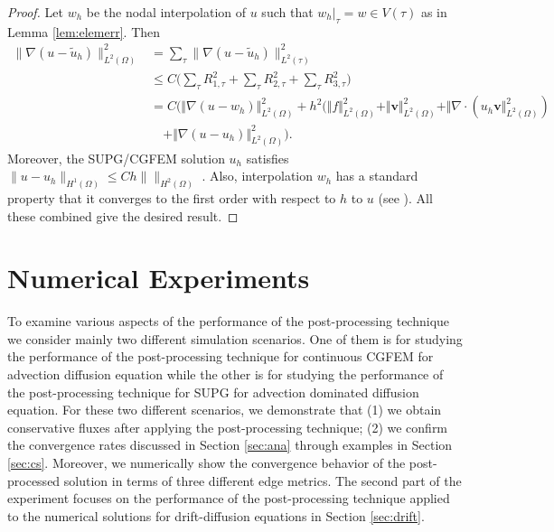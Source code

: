 \documentclass[times]{nlaauth}
\numberwithin{equation}{section}
\begin{document}
\begin{proof}
Let $w_h$ be the nodal interpolation of $u$ such that $w_h|_\tau = w \in V(\tau)$ as in Lemma \ref{lem:elemerr}. Then
\begin{equation*}
\begin{aligned}
\| \nabla ( u - \widetilde u_h) \|^2_{L^2(\Omega)} & = \sum_{\tau} \| \nabla ( u - \widetilde u_h) \|^2_{L^2(\tau)} \\
& \leq
C\Big( \sum_{\tau} R^2_{1, \tau} + \sum_{\tau} R^2_{2, \tau} + \sum_{\tau} R^2_{3, \tau} \Big) \\
&= C \Big( \Vert \nabla(u - w_h) \Vert^2_{L^2(\Omega)}
+ h^2 ( \Vert f \Vert^2_{L^2(\Omega)} + \Vert \boldsymbol{v} \Vert^2_{L^2(\Omega)}
+ \Vert \nabla \cdot (u_h \boldsymbol{v} \Vert^2_{L^2(\Omega)} )\\
&\quad+ \Vert \nabla(u - u_h) \Vert^2_{L^2(\Omega)} \Big).
\end{aligned}
\end{equation*}
Moreover, the SUPG/CGFEM solution $u_h$ satisfies $ \| u - u_h \|_{H^1(\Omega)} \leq Ch\| \|_{H^2(\Omega)}$ \cite{brenner2008mathematical, johnson1984finite, roos2008robust}. Also, interpolation $w_h$ has a standard property
that it converges to the first order with respect to $h$ to $u$
(see \cite{brenner2008mathematical}). All these combined give the desired result.
\end{proof}

\section{Numerical Experiments}\label{sec:num}

\noindent
To examine various aspects of the performance of the post-processing technique we consider mainly two different simulation scenarios. One of them is for studying the performance of the post-processing technique for continuous CGFEM for advection diffusion equation while the other is for studying the performance of the post-processing technique for SUPG for advection dominated diffusion equation. For these two different scenarios, we demonstrate that (1) we obtain conservative fluxes after applying the post-processing technique; (2) we confirm the convergence rates discussed in Section \ref{sec:ana} through examples in Section \ref{sec:cs}. Moreover, we numerically show the convergence behavior of the post-processed solution in terms of three different edge metrics. The second part of the experiment focuses on the performance of the post-processing technique applied to the numerical solutions for drift-diffusion equations in Section \ref{sec:drift}.
\end{document}

